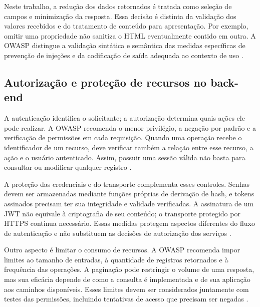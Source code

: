 Neste trabalho, a redução dos dados retornados é tratada como seleção de campos e minimização da resposta. Essa decisão é distinta da validação dos valores recebidos e do tratamento de conteúdo para apresentação. Por exemplo, omitir uma propriedade não sanitiza o HTML eventualmente contido em outra. A OWASP distingue a validação sintática e semântica das medidas específicas de prevenção de injeções e da codificação de saída adequada ao contexto de uso \cite{owasp2026input}.

\subsection{Autorização e proteção de recursos no back-end}
\label{subsec:fundamentos-seguranca-api}

A autenticação identifica o solicitante; a autorização determina quais ações ele pode realizar. A OWASP recomenda o menor privilégio, a negação por padrão e a verificação de permissões em cada requisição. Quando uma operação recebe o identificador de um recurso, deve verificar também a relação entre esse recurso, a ação e o usuário autenticado. Assim, possuir uma sessão válida não basta para consultar ou modificar qualquer registro \cite{owasp2026authorization,owasp2023objetos}.

A proteção das credenciais e do transporte complementa esses controles. Senhas devem ser armazenadas mediante funções próprias de derivação de hash, e tokens assinados precisam ter sua integridade e validade verificadas. A assinatura de um JWT não equivale à criptografia de seu conteúdo; o transporte protegido por HTTPS continua necessário. Essas medidas protegem aspectos diferentes do fluxo de autenticação e não substituem as decisões de autorização dos serviços \cite{owasp2026password,owasp2026rest}.

Outro aspecto é limitar o consumo de recursos. A OWASP recomenda impor limites ao tamanho de entradas, à quantidade de registros retornados e à frequência das operações. A paginação pode restringir o volume de uma resposta, mas sua eficácia depende de como a consulta é implementada e de sua aplicação aos caminhos disponíveis. Esses limites devem ser considerados juntamente com testes das permissões, incluindo tentativas de acesso que precisam ser negadas \cite{owasp2023recursos,owasp2026authorization}.
